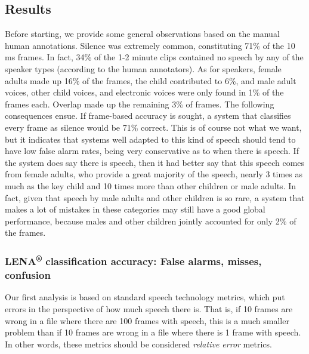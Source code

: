 \documentclass[english,table,man,floatsintext]{apa6}
\begin{document}
\hypertarget{results}{%
\subsection{Results}\label{results}}

Before starting, we provide some general observations based on the manual human annotations. Silence was extremely common, constituting 71\% of the 10 ms frames. In fact, 34\% of the 1-2 minute clips contained no speech by any of the speaker types (according to the human annotators). As for speakers, female adults made up 16\% of the frames, the child contributed to 6\%, and male adult voices, other child voices, and electronic voices were only found in 1\% of the frames each. Overlap made up the remaining 3\% of frames. The following consequences ensue. If frame-based accuracy is sought, a system that classifies every frame as silence would be 71\% correct. This is of course not what we want, but it indicates that systems well adapted to this kind of speech should tend to have low false alarm rates, being very conservative as to when there is speech. If the system does say there is speech, then it had better say that this speech comes from female adults, who provide a great majority of the speech, nearly 3 times as much as the key child and 10 times more than other children or male adults. In fact, given that speech by male adults and other children is so rare, a system that makes a lot of mistakes in these categories may still have a good global performance, because males and other children jointly accounted for only 2\% of the frames.

\hypertarget{lena-classification-accuracy-false-alarms-misses-confusion}{%
\subsubsection{\texorpdfstring{LENA\textsuperscript{®} classification accuracy: False alarms, misses, confusion}{LENA® classification accuracy: False alarms, misses, confusion}}\label{lena-classification-accuracy-false-alarms-misses-confusion}}

Our first analysis is based on standard speech technology metrics, which put errors in the perspective of how much speech there is. That is, if 10 frames are wrong in a file where there are 100 frames with speech, this is a much smaller problem than if 10 frames are wrong in a file where there is 1 frame with speech. In other words, these metrics should be considered \emph{relative error} metrics.
\end{document}
